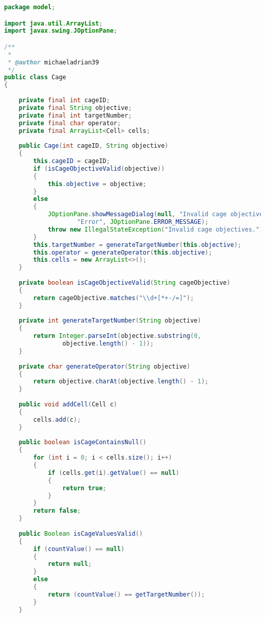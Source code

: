 \begin{lstlisting}[language=Java,basicstyle=\tiny,caption=SolverGenetic.java]
package model;

import java.util.ArrayList;
import javax.swing.JOptionPane;

/**
 *
 * @author michaeladrian39
 */
public class Cage
{
    
    private final int cageID;
    private final String objective;
    private final int targetNumber;
    private final char operator;
    private final ArrayList<Cell> cells;
    
    public Cage(int cageID, String objective)
    {
        this.cageID = cageID;
        if (isCageObjectiveValid(objective))
        {
            this.objective = objective;
        }
        else
        {
            JOptionPane.showMessageDialog(null, "Invalid cage objectives.", 
                    "Error", JOptionPane.ERROR_MESSAGE);
            throw new IllegalStateException("Invalid cage objectives.");
        }
        this.targetNumber = generateTargetNumber(this.objective);
        this.operator = generateOperator(this.objective);
        this.cells = new ArrayList<>();
    }
    
    private boolean isCageObjectiveValid(String cageObjective)
    {
        return cageObjective.matches("\\d+[*+-/=]");
    }
    
    private int generateTargetNumber(String objective)
    {
        return Integer.parseInt(objective.substring(0, 
                objective.length() - 1));
    }
    
    private char generateOperator(String objective)
    {
        return objective.charAt(objective.length() - 1);
    }
    
    public void addCell(Cell c)
    {
        cells.add(c);
    }
    
    public boolean isCageContainsNull()
    {
        for (int i = 0; i < cells.size(); i++)
        {
            if (cells.get(i).getValue() == null)
            {
                return true;
            }
        }
        return false;
    }
    
    public Boolean isCageValuesValid()
    {
        if (countValue() == null)
        {
            return null;
        }
        else
        {
            return (countValue() == getTargetNumber());
        }
    }
    

\end{lstlisting}

